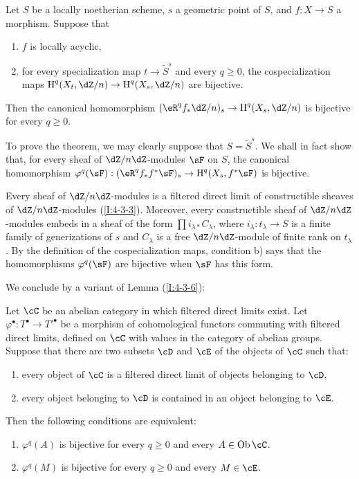 \begin{theorem}\label{I:5-1-7}
Let $S$ be a locally noetherian scheme, $s$ a geometric point of $S$,
and $f:X\to S$ a morphism. Suppose that
\begin{enumerate}[\indent a)]
  \item $f$ is locally acyclic,
  \item for every specialization map $t\to\widetilde S^s$ and every
    $q\geqslant0$, the cospecialization maps
    $\h^q(X_t,\dZ/n)\to\h^q(X_s,\dZ/n)$ are bijective.
\end{enumerate}
Then the canonical homomorphism
$(\eR^qf_*\dZ/n)_s\to\h^q(X_s,\dZ/n)$ is bijective for every
$q\geqslant0$.
\end{theorem}

To prove the theorem, we may clearly suppose that
$S=\widetilde S^s$. We shall in fact show that, for every sheaf of
$\dZ/n\dZ$-modules $\sF$ on $S$, the canonical homomorphism
$\varphi^q(\sF):(\eR^qf_*f^*\sF)_s\to\h^q(X_s,f^*\sF)$ is bijective.

Every sheaf of $\dZ/n\dZ$-modules is a filtered direct limit of
constructible sheaves of $\dZ/n\dZ$-modules (\ref{I:4-3-3}). Moreover,
every constructible sheaf of $\dZ/n\dZ$-modules embeds in a sheaf of the
form $\prod i_{\lambda *}C_\lambda$, where
$i_\lambda:t_\lambda\to S$ is a finite family of generizations of $s$
and $C_\lambda$ is a free $\dZ/n\dZ$-module of finite rank on
$t_\lambda$. By the definition of the cospecialization maps, condition
b) says that the homomorphisms $\varphi^q(\sF)$ are bijective when
$\sF$ has this form.

We conclude by a variant of Lemma (\ref{I:4-3-6}):

\begin{lemma}\label{I:5-1-8}
Let $\cC$ be an abelian category in which filtered direct limits exist.
Let $\varphi^\bullet:T^\bullet\to{T'}^\bullet$ be a morphism of
cohomological functors commuting with filtered direct limits, defined on
$\cC$ with values in the category of abelian groups. Suppose that there
are two subsets $\cD$ and $\cE$ of the objects of $\cC$ such that:
\begin{enumerate}[\indent a)]
  \item every object of $\cC$ is a filtered direct limit of objects
    belonging to $\cD$,
  \item every object belonging to $\cD$ is contained in an object
    belonging to $\cE$.
\end{enumerate}
Then the following conditions are equivalent:
\begin{enumerate}[\indent (i)]
  \item $\varphi^q(A)$ is bijective for every $q\geqslant0$ and every
    $A\in\ob\cC$.
  \item $\varphi^q(M)$ is bijective for every $q\geqslant0$ and every
    $M\in\cE$.
\end{enumerate}
\end{lemma}

